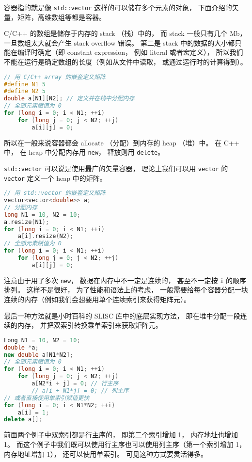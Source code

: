 


容器指的就是像 \verb|std::vector| 这样的可以储存多个元素的对象， 下面介绍的矢量，矩阵，高维数组等都是容器。

C/C++ 的数组是储存于内存的 stack （栈）中的， 而 stack 一般只有几个 Mb， 一旦数组太大就会产生 stack overflow 错误。 第二是 stack 中的数据的大小都只能在编译时确定（即 constant expression， 例如 literal 或者宏定义）， 所以我们不能在运行是确定数组的长度（例如从文件中读取， 或通过运行时的计算得到）。
\begin{lstlisting}[language=cpp]
// 用 C/C++ array 的嵌套定义矩阵
#define N1 5
#define N2 5
double a[N1][N2]; // 定义并在栈中分配内存
// 全部元素赋值为 0
for (long i = 0; i < N1; ++i)
    for (long j = 0; j < N2; ++j)
        a[i][j] = 0;
\end{lstlisting}

所以在一般来说容器都会 allocate （分配）到内存的 heap （堆）中。 在 C++ 中， 在 heap 中分配内存用 \verb|new|， 释放则用 \verb|delete|。

\verb|std::vector| 可以说是使用最广的矢量容器， 理论上我们可以用 \verb|vector| 的 \verb|vector| 定义一个 heap 中的矩阵。
\begin{lstlisting}[language=cpp]
// 用 std::vector 的嵌套定义矩阵
vector<vector<double>> a;
// 分配内存
long N1 = 10, N2 = 10;
a.resize(N1);
for (long i = 0; i < N1; ++i)
    a[i].resize(N2);
// 全部元素赋值为 0
for (long i = 0; i < N1; ++i)
    for (long j = 0; j < N2; ++j)
        a[i][j] = 0;
\end{lstlisting}
注意由于用了多次 \verb|new|， 数据在内存中不一定是连续的， 甚至不一定按 \verb|i| 的顺序排列。 这样不是很好， 为了性能和语法上的考虑， 一般需要给每个容器分配一块连续的内存（例如我们会想要用单个连续索引来获得矩阵元）。

最后一种方法就是小时百科的 SLISC 库中的底层实现方法， 即在堆中分配一段连续的内存， 并把双索引转换乘单索引来获取矩阵元。
\begin{lstlisting}[language=cpp]
Long N1 = 10, N2 = 10;
double *a;
new double a[N1*N2];
// 全部元素赋值为 0
for (long i = 0; i < N1; ++i)
    for (long j = 0; j < N2; ++j)
        a[N2*i + j] = 0; // 行主序
        // a[i + N1*j] = 0; // 列主序
// 或者直接使用单索引赋值更快
for (long i = 0; i < N1*N2; ++i)
    a[i] = 1;
delete a[];
\end{lstlisting}
前面两个例子中双索引都是行主序的， 即第二个索引增加 1， 内存地址也增加 1。 而这个例子中我们既可以使用行主序也可以使用列主序（第一个索引增加 1， 内存地址增加 1）， 还可以使用单索引。 可见这种方式要灵活得多。

